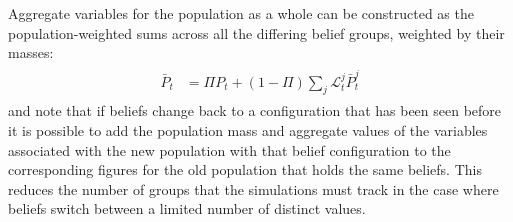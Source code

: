 \documentclass{handout}
\begin{document}
Aggregate variables for the population as a whole can be constructed as the population-weighted
sums across all the differing belief groups, weighted by their masses:
\begin{equation}\begin{gathered}\begin{aligned}
  \bar{P}_{t} & =  \Pi P_{t} + (1-\Pi) \sum_{j} \mathcal{L}^{j}_{t} \bar{P}^{j}_{t}  
\end{aligned}\end{gathered}\end{equation}
and note that if beliefs change back to a configuration that has been seen before it
is possible to add the population mass and aggregate values of the variables associated
with the new population with that belief configuration to the corresponding figures for 
the old population that holds the same beliefs.  This reduces the number of groups that
the simulations must track in the case where beliefs switch between a limited number of 
distinct values.  
\end{document}
